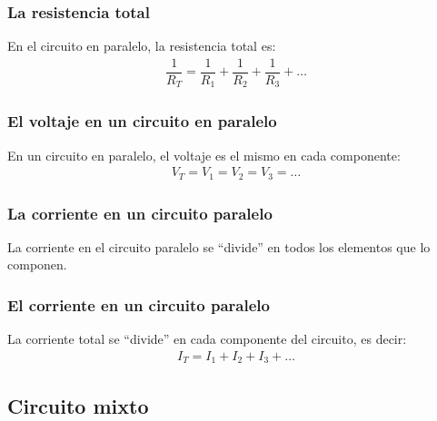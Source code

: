 \documentclass[14pt]{beamer}
\begin{document}
\begin{frame}
\frametitle{La resistencia total}
En el circuito en paralelo, la resistencia total es:
\pause
\begin{align*}
\dfrac{1}{R_{T}} = \dfrac{1}{R_{1}} + \dfrac{1}{R_{2}} + \dfrac{1}{R_{3}} + \ldots
\end{align*}
\end{frame}
\begin{frame}
\frametitle{El voltaje en un circuito en paralelo}
En un circuito en paralelo, el voltaje es el mismo en cada componente:
\pause
\begin{align*}
V_{T} = V_{1} = V_{2} = V_{3} = \ldots
\end{align*}
\end{frame}
\begin{frame}
\frametitle{La corriente en un circuito paralelo}
La corriente en el circuito paralelo se \enquote{divide} en todos los elementos que lo componen.
\end{frame}
\begin{frame}
\frametitle{El corriente en un circuito paralelo}
La corriente total se \enquote{divide} en cada componente del circuito, es decir:
\pause
\begin{align*}
I_{T} = I_{1} + I_{2} + I_{3} + \ldots 
\end{align*}
\end{frame}

\subsection{Circuito mixto}
\end{document}
